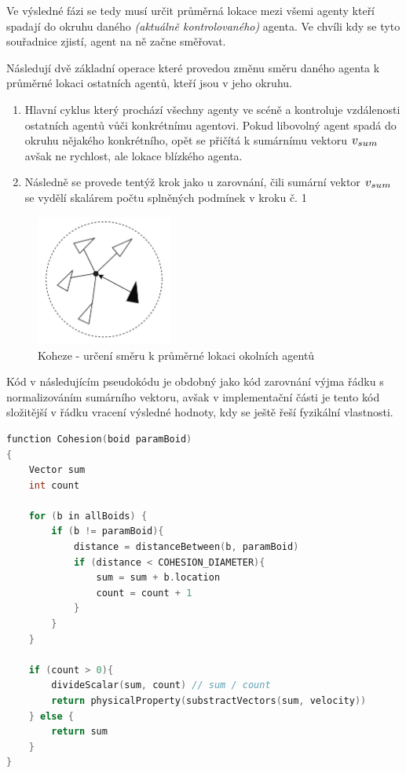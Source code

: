 \documentclass[czech,public,dept460,male,cpdeclaration]{diploma}
\begin{document}
Ve výsledné fázi se tedy musí určit průměrná lokace mezi všemi agenty kteří spadají do okruhu daného \textit{(aktuálně kontrolovaného)} agenta. Ve chvíli kdy se tyto souřadnice zjistí, agent na ně začne směřovat.

Následují dvě základní operace které provedou změnu směru daného agenta k průměrné lokaci ostatních agentů, kteří jsou v jeho okruhu.

\begin{enumerate}
	\item Hlavní cyklus který prochází všechny agenty ve scéně a kontroluje vzdálenosti ostatních agentů vůči konkrétnímu agentovi. Pokud libovolný agent spadá do okruhu nějakého konkrétního, opět se přičítá k sumárnímu vektoru \( \scalebox{1.2}{$v_{sum}$} \) avšak ne rychlost, ale lokace blízkého agenta.
	\item Následně se provede tentýž krok jako u zarovnání, čili sumární vektor \( \scalebox{1.2}{$v_{sum}$} \) se vydělí skalárem počtu splněných podmínek v kroku č. 1
	
\end{enumerate}

\begin{figure}[H]\centering\includegraphics[width=0.4\textwidth]{Figures/cohesion2.jpg}
	\caption{Koheze - určení směru k průměrné lokaci okolních agentů}
\end{figure}

Kód v následujícím pseudokódu je obdobný jako kód zarovnání výjma řádku s normalizováním sumárního vektoru, avšak v implementační části je tento kód složitější v řádku vracení výsledné hodnoty, kdy se ještě řeší fyzikální vlastnosti.

\begin{lstlisting}[language=c++,label=src:Cohesion pseudocode,caption=Pseudokód pro kohezi]
function Cohesion(boid paramBoid)
{	
	Vector sum
	int count
	
	for (b in allBoids) {
		if (b != paramBoid){
			distance = distanceBetween(b, paramBoid)
			if (distance < COHESION_DIAMETER){
				sum = sum + b.location
				count = count + 1
			}
		}
	}
	
	if (count > 0){
		divideScalar(sum, count) // sum / count
		return physicalProperty(substractVectors(sum, velocity))
	} else {
		return sum
	}
}
\end{lstlisting}
\end{document}
